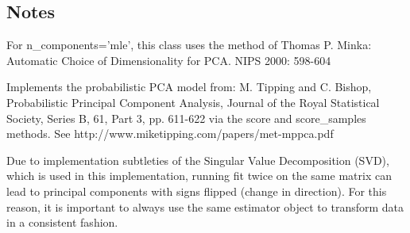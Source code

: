 \subsection*{Notes}
For n_components=’mle’, this class uses the method of Thomas P. Minka: Automatic Choice of Dimensionality for PCA. NIPS 2000: 598-604

Implements the probabilistic PCA model from: M. Tipping and C. Bishop, Probabilistic Principal Component Analysis, Journal of the Royal Statistical Society, Series B, 61, Part 3, pp. 611-622 via the score and score_samples methods. See http://www.miketipping.com/papers/met-mppca.pdf

Due to implementation subtleties of the Singular Value Decomposition (SVD), which is used in this implementation, running fit twice on the same matrix can lead to principal components with signs flipped (change in direction). For this reason, it is important to always use the same estimator object to transform data in a consistent fashion.
